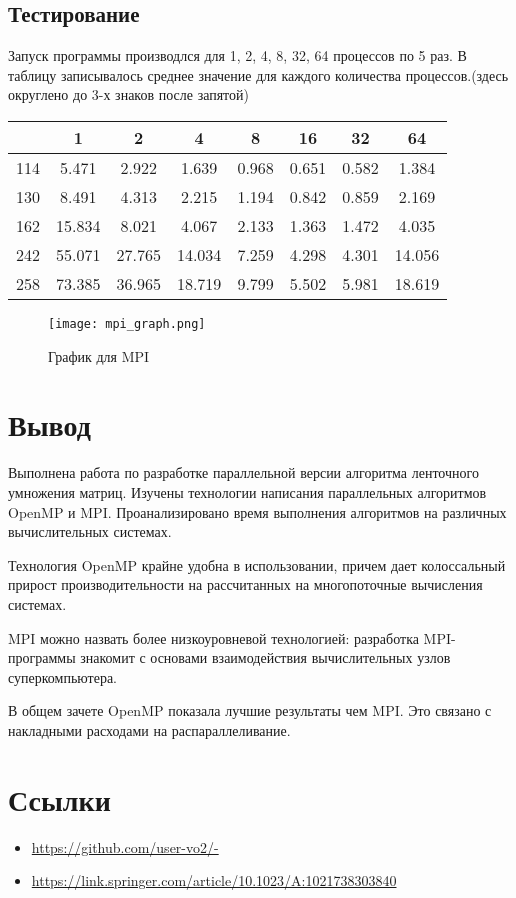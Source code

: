 \documentclass[a4paper,12pt,titlepage,final]{article}
\begin{document}
\subsection{Тестирование}
Запуск программы производлся для 1, 2, 4, 8, 32, 64 процессов по 5 раз. В таблицу записывалось среднее значение для каждого количества процессов.(здесь округлено до 3-х знаков после запятой)\par
\begin{tabular}{|c|c|c|c|c|c|c|c|}
\hline
	& 1 &	2 &	4 &	8 &	16 & 32 & 64\\
    \hline
114 &	5.471 & 2.922 & 1.639 &	0.968 &	0.651 &	0.582 &	1.384\\
    \hline
130 &	8.491 &	4.313 &	2.215 &	1.194 &	0.842 &	0.859 &	2.169\\
    \hline
162 &	15.834 &	8.021 &	4.067 &	2.133 &	1.363 &	1.472 &	4.035\\
    \hline
242 &	55.071 &	27.765 &	14.034 &	7.259 &	4.298 &	4.301 &	14.056\\
    \hline
258 &	73.385 &	36.965 &	18.719 &	9.799 &	5.502 &	5.981 &	18.619\\
    \hline
\end{tabular}
\par

\begin{figure}[h!]
  \texttt{[image: mpi\_graph.png]}
  \caption{График для MPI}
  \label{fig:mpi_graph}
\end{figure}
\newpage

\section{Вывод}
Выполнена работа по разработке параллельной версии алгоритма ленточного умножения матриц. Изучены
технологии написания параллельных алгоритмов OpenMP и MPI. Проанализировано время выполнения
алгоритмов на различных вычислительных системах.\par
Технология OpenMP крайне удобна в использовании, причем дает колоссальный прирост производительности на
рассчитанных на многопоточные вычисления системах.\par
MPI можно назвать более низкоуровневой технологией: разработка MPI-программы знакомит с основами
взаимодействия вычислительных узлов суперкомпьютера.\par
В общем зачете OpenMP показала лучшие результаты чем MPI. Это связано с накладными расходами на распараллеливание.
\section{Ссылки}
\begin{raggedright}
\begin{itemize}
\item \url{https://github.com/user-vo2/-}
\item \url{https://link.springer.com/article/10.1023/A:1021738303840}
\end{itemize}
\end{raggedright}
\end{document}
